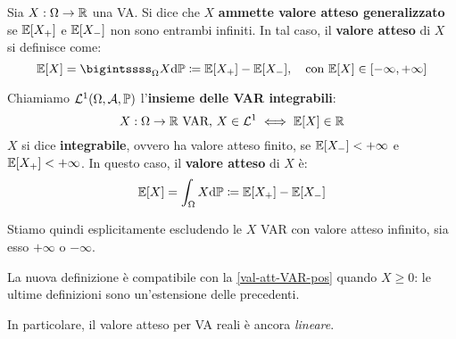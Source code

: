 \begin{defn}
  Sia $X:\Omega \to \mathbb R$ una VA.
  Si dice che $X$ \textbf{ammette valore atteso generalizzato} se $\mathbb E[X_+]$ e $\mathbb E[X_-]$ non sono entrambi infiniti.
  In tal caso, il \textbf{valore atteso} di $X$ si definisce come:
  $$\EE[X] = \bigintssss_\Omega X \dPP \coloneqq \EE[X_+] - \EE[X_-], \quad \text{con } \EE[X] \in [-\infty, +\infty]$$
\end{defn}

\medskip

\begin{defn}
  Chiamiamo $\mathcal L^1 (\Omega, \mathcal A, \mathbb P)$ l'\textbf{insieme delle VAR integrabili}:
  $$X:\Omega \to \mathbb R \text{ VAR, } X \in \mathcal L^1 \iff \mathbb E[X] \in \mathbb R$$
  $X$ si dice \textbf{integrabile}, ovvero ha valore atteso finito, se $\mathbb E[X_-] < +\infty$ e $\mathbb E[X_+] < +\infty$.
  In questo caso, il \textbf{valore atteso} di $X$ è:
  $$\mathbb E[X] = \int_{\Omega} X \mathrm d \mathbb P \coloneqq \mathbb E[X_+] - \mathbb E[X_-]$$
\end{defn}
Stiamo quindi esplicitamente escludendo le $X$ VAR con valore atteso infinito, sia esso $+\infty$ o $-\infty$.

\smallskip
\begin{nb}
  La nuova definizione è compatibile con la \ref{val-att-VAR-pos} quando $X \geq 0$:
  le ultime definizioni sono un'estensione delle precedenti.
\end{nb}
In particolare, il valore atteso per VA reali è ancora \emph{lineare}.

